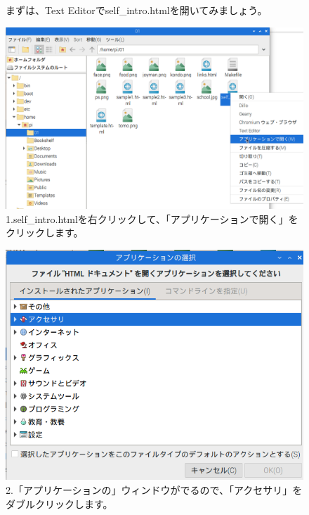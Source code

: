 \documentclass[a4paper,12pt]{jarticle}
\begin{document}
\begin{figure}[ht]
  \begin{minipage}{\textwidth}
    \flushleft
    まずは、Text
    Editorでself\_intro.htmlを開いてみましょう。
    \begin{minipage}{0.45\linewidth}
      \includegraphics[width=\linewidth]{textbook-img1040.png}\\
      1.self\_intro.htmlを右クリックして、「アプリケーションで開く」をクリックします。
    \end{minipage}
    \hfill
    \vspace{20pt}
    \begin{minipage}{0.45\linewidth}
      \includegraphics[width=\linewidth]{textbook-img1041.png}\\
      2.「アプリケーションの」ウィンドウがでるので、「アクセサリ」をダブルクリックします。
    \end{minipage}

\end{minipage}
\end{figure}
\end{document}
